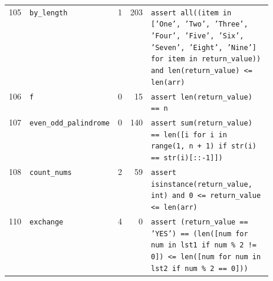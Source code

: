 \begin{footnotesize}
\begin{longtable}{@{}r l r r p{0.52\linewidth}@{}}
105 & \texttt{by\_length} & 1 & 203 & \texttt{assert \allowbreak{}all(\allowbreak{}(\allowbreak{}item \allowbreak{}in \allowbreak{}[\allowbreak{}'\allowbreak{}One'\allowbreak{},\allowbreak{} \allowbreak{}'\allowbreak{}Two'\allowbreak{},\allowbreak{} \allowbreak{}'\allowbreak{}Three'\allowbreak{},\allowbreak{} \allowbreak{}'\allowbreak{}Four'\allowbreak{},\allowbreak{} \allowbreak{}'\allowbreak{}Five'\allowbreak{},\allowbreak{} \allowbreak{}'\allowbreak{}Six'\allowbreak{},\allowbreak{} \allowbreak{}'\allowbreak{}Seven'\allowbreak{},\allowbreak{} \allowbreak{}'\allowbreak{}Eight'\allowbreak{},\allowbreak{} \allowbreak{}'\allowbreak{}Nine'\allowbreak{}]\allowbreak{} \allowbreak{}for \allowbreak{}item \allowbreak{}in \allowbreak{}return\_value)\allowbreak{})\allowbreak{} \allowbreak{}and \allowbreak{}len(\allowbreak{}return\_value)\allowbreak{} \allowbreak{}<\allowbreak{}=\allowbreak{} \allowbreak{}len(\allowbreak{}arr)\allowbreak{}} \\
106 & \texttt{f} & 0 & 15 & \texttt{assert \allowbreak{}len(\allowbreak{}return\_value)\allowbreak{} \allowbreak{}=\allowbreak{}=\allowbreak{} \allowbreak{}n} \\
107 & \texttt{even\_odd\_palindrome} & 0 & 140 & \texttt{assert \allowbreak{}sum(\allowbreak{}return\_value)\allowbreak{} \allowbreak{}=\allowbreak{}=\allowbreak{} \allowbreak{}len(\allowbreak{}[\allowbreak{}i \allowbreak{}for \allowbreak{}i \allowbreak{}in \allowbreak{}range(\allowbreak{}1,\allowbreak{} \allowbreak{}n \allowbreak{}+\allowbreak{} \allowbreak{}1)\allowbreak{} \allowbreak{}if \allowbreak{}str(\allowbreak{}i)\allowbreak{} \allowbreak{}=\allowbreak{}=\allowbreak{} \allowbreak{}str(\allowbreak{}i)\allowbreak{}[\allowbreak{}:\allowbreak{}:\allowbreak{}-\allowbreak{}1]\allowbreak{}]\allowbreak{})\allowbreak{}} \\
108 & \texttt{count\_nums} & 2 & 59 & \texttt{assert \allowbreak{}isinstance(\allowbreak{}return\_value,\allowbreak{} \allowbreak{}int)\allowbreak{} \allowbreak{}and \allowbreak{}0 \allowbreak{}<\allowbreak{}=\allowbreak{} \allowbreak{}return\_value \allowbreak{}<\allowbreak{}=\allowbreak{} \allowbreak{}len(\allowbreak{}arr)\allowbreak{}} \\
110 & \texttt{exchange} & 4 & 0 & \texttt{assert \allowbreak{}(\allowbreak{}return\_value \allowbreak{}=\allowbreak{}=\allowbreak{} \allowbreak{}'\allowbreak{}YES'\allowbreak{})\allowbreak{} \allowbreak{}=\allowbreak{}=\allowbreak{} \allowbreak{}(\allowbreak{}len(\allowbreak{}[\allowbreak{}num \allowbreak{}for \allowbreak{}num \allowbreak{}in \allowbreak{}lst1 \allowbreak{}if \allowbreak{}num \allowbreak{}\% \allowbreak{}2 \allowbreak{}!=\allowbreak{} \allowbreak{}0]\allowbreak{})\allowbreak{} \allowbreak{}<\allowbreak{}=\allowbreak{} \allowbreak{}len(\allowbreak{}[\allowbreak{}num \allowbreak{}for \allowbreak{}num \allowbreak{}in \allowbreak{}lst2 \allowbreak{}if \allowbreak{}num \allowbreak{}\% \allowbreak{}2 \allowbreak{}=\allowbreak{}=\allowbreak{} \allowbreak{}0]\allowbreak{})\allowbreak{})\allowbreak{}} \\

\end{longtable}
\end{footnotesize}
